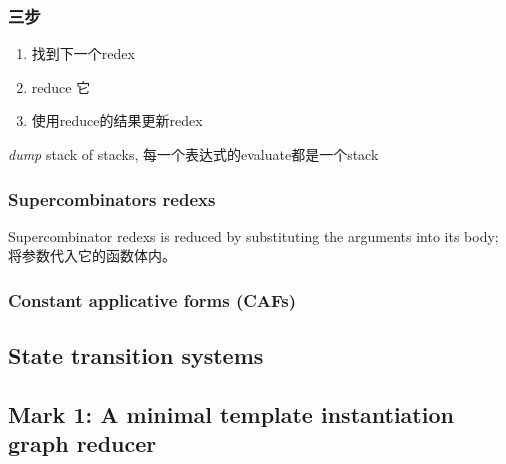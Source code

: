 \documentclass [11pt, a4paper]{article}
\begin{document}
\begin{flushleft}
\begin{CJK*}{UTF8}{song}
    \subsubsection{三步}
    \begin{enumerate}[1.]
        \item 找到下一个redex
        \item reduce 它
        \item 使用reduce的结果更新redex
    \end{enumerate}

    \emph{dump} stack of stacks, 每一个表达式的evaluate都是一个stack
    \subsubsection{Supercombinators redexs}
    Supercombinator redexs is reduced by substituting the arguments into its body; 将参数代入它的函数体内。
    \subsubsection{Constant applicative forms \textbf{(CAFs)}}

    \subsection{State transition systems}

    \newpage
    \subsection{Mark 1: A minimal template instantiation graph reducer}

\end{CJK*}
\end{flushleft}
\end{document}

